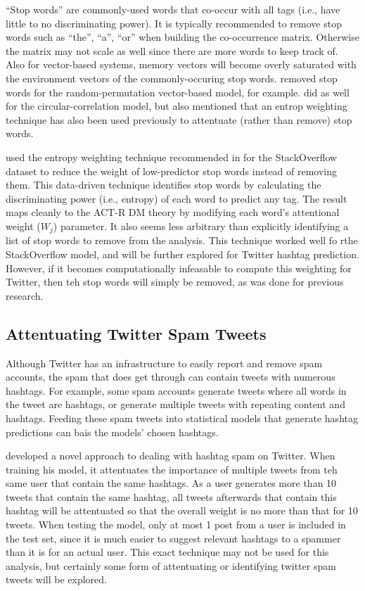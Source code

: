\documentclass[man,floatsintext]{apa6}
\begin{document}
``Stop words'' are commonly-used words that co-occur with all tags (i.e., have little to no discriminating power).
It is typically recommended \parencite{Bird2009} to remove stop words such as ``the'', ``a'', ``or'' when building the co-occurrence matrix.
Otherwise the matrix may not scale as well since there are more words to keep track of. 
Also for vector-based systems, memory vectors will become overly saturated with the environment vectors of the commonly-occuring stop words.
\textcite{Sahlgren2008} removed stop words for the random-permutation vector-based model, for example.
\textcite{Jones2007} did as well for the circular-correlation model, but also mentioned that an entrop weighting technique has also been used previously to attentuate (rather than remove) stop words.

\textcite{Stanley2013} used the entropy weighting technique recommended in \textcite{Dumais1991} for the StackOverflow dataset to reduce the weight of low-predictor stop words instead of removing them.
This data-driven technique identifies stop words by calculating the discriminating power (i.e., entropy) of each word to predict any tag.
The result maps cleanly to the ACT-R DM theory by modifying each word's attentional weight ($W_{j}$) parameter.
It also seems less arbitrary than explicitly identifying a list of stop words to remove from the analysis.
This technique worked well fo rthe StackOverflow model, and will be further explored for Twitter hashtag prediction.
However, if it becomes computationally infeasable to compute this weighting for Twitter, then teh stop words will simply be removed, as was done for previous research.

\subsection{Attentuating Twitter Spam Tweets}

Although Twitter has an infrastructure to easily report and remove spam accounts, the spam that does get through can contain tweets with numerous hashtags.
For example, some spam accounts generate tweets where all words in the tweet are hashtags, or generate multiple tweets with repeating content and hashtags.
Feeding these spam tweets into statistical models that generate hashtag predictions can bais the models' chosen hashtags.

\textcite{Mazzia2009} developed a novel approach to dealing with hashtag spam on Twitter.
When training his model, it attentuates the importance of multiple tweets from teh same user that contain the same hashtags.
As a user generates more than 10 tweets that contain the same hashtag, all tweets afterwards that contain this hashtag will be attentuated so that the overall weight is no more than that for 10 tweets.
When testing the model, only at most 1 post from a user is included in the test set, since it is much easier to suggest relevant hashtags to a spammer than it is for an actual user.
This exact technique may not be used for this analysis, but certainly some form of attentuating or identifying twitter spam tweets will be explored.
\end{document}
